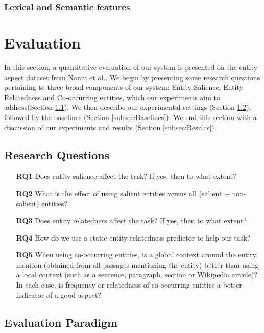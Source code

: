 \documentclass[sigconf,authordraft]{acmart}
\begin{document}
\subsubsection{Lexical and Semantic features}
\label{subsubsec:Lexical and Semantic features}

\section{Evaluation}
\label{sec:Evaluation}
In this section, a quantitative evaluation of our system is presented on the entity-aspect dataset from Nanni et al.\cite{nanni2018entity}. We begin by presenting some research questions pertaining to three broad components of our system: Entity Salience, Entity Relatedness and Co-occurring entities, which our experiments aim to address(Section \ref{subsec:Research Questions}). We then describe our experimental settings (Section \ref{subsec:Evaluation Paradigm}), followed by the baselines (Section \ref{subsec:Baselines}). We end this section with a discussion of our experiments and results (Section \ref{subsec:Results}).

\subsection{Research Questions}
\label{subsec:Research Questions}

\begin{itemize}
\item[\textbf{RQ1}] Does entity salience affect the task? If yes, then to what extent?
\item[\textbf{RQ2}] What is the effect of using salient entities versus all (salient + non-salient) entities? 
\item[\textbf{RQ3}] Does entity relatedness affect the task? If yes, then to what extent? 
\item[\textbf{RQ4}] How do we use a static entity relatedness predictor to help our task?
\item[\textbf{RQ5}] When using co-occurring entities, is a global context around the entity mention (obtained from all passages mentioning the entity) better than using a local context (such as a sentence, paragraph, section or Wikipedia article)? In each case, is frequency or relatedness of co-occurring entities a better indicator of a good aspect?
\end{itemize}

\subsection{Evaluation Paradigm}
\label{subsec:Evaluation Paradigm}
\end{document}
